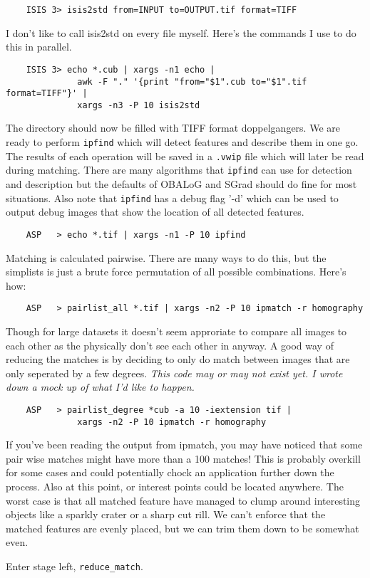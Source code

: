 \begin{verbatim}
    ISIS 3> isis2std from=INPUT to=OUTPUT.tif format=TIFF
\end{verbatim}

I don't like to call isis2std on every file myself. Here's the
commands I use to do this in parallel.

\begin{verbatim}
    ISIS 3> echo *.cub | xargs -n1 echo |
              awk -F "." '{print "from="$1".cub to="$1".tif format=TIFF"}' |
              xargs -n3 -P 10 isis2std
\end{verbatim}

The directory should now be filled with TIFF format doppelgangers. We
are ready to perform \texttt{ipfind} which will detect features and
describe them in one go. The results of each operation will be saved
in a \texttt{.vwip} file which will later be read during
matching. There are many algorithms that \texttt{ipfind} can use for
detection and description but the defaults of OBALoG and SGrad should
do fine for most situations. Also note that \texttt{ipfind} has a
debug flag '-d' which can be used to output debug images that show the
location of all detected features.

\begin{verbatim}
    ASP   > echo *.tif | xargs -n1 -P 10 ipfind
\end{verbatim}

Matching is calculated pairwise. There are many ways to do this, but
the simplists is just a brute force permutation of all possible
combinations. Here's how:

\begin{verbatim}
    ASP   > pairlist_all *.tif | xargs -n2 -P 10 ipmatch -r homography
\end{verbatim}

Though for large datasets it doesn't seem approriate to compare all
images to each other as the physically don't see each other in
anyway. A good way of reducing the matches is by deciding to only do
match between images that are only seperated by a few
degrees. \emph{This code may or may not exist yet. I wrote down a mock
  up of what I'd like to happen.}

\begin{verbatim}
    ASP   > pairlist_degree *cub -a 10 -iextension tif |
              xargs -n2 -P 10 ipmatch -r homography
\end{verbatim}

If you've been reading the output from ipmatch, you may have noticed
that some pair wise matches might have more than a 100 matches! This
is probably overkill for some cases and could potentially chock an
application further down the process. Also at this point, or interest
points could be located anywhere. The worst case is that all matched
feature have managed to clump around interesting objects like a
sparkly crater or a sharp cut rill. We can't enforce that the matched
features are evenly placed, but we can trim them down to be somewhat
even.

Enter stage left, \texttt{reduce\_match}.
